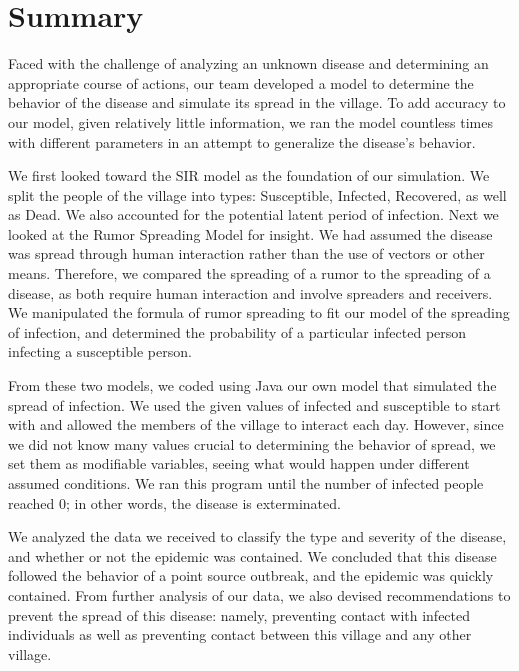 \documentclass[12pt]{article}
\begin{document}
\cfoot{}

\section{Summary}
Faced with the challenge of analyzing an unknown disease and determining an appropriate course of actions, our team developed a model to determine the behavior of the disease and simulate its spread in the village. To add accuracy to our model, given relatively little information, we ran the model countless times with different parameters in an attempt to generalize the disease’s behavior.

We first looked toward the SIR model as the foundation of our simulation. We split the people of the village into types: Susceptible, Infected, Recovered, as well as Dead. We also accounted for the potential latent period of infection. Next we looked at the Rumor Spreading Model for insight. We had assumed the disease was spread through human interaction rather than the use of vectors or other means. Therefore, we compared the spreading of a rumor to the spreading of a disease, as both require human interaction and involve spreaders and receivers. We manipulated the formula of rumor spreading to fit our model of the spreading of infection, and determined the probability of a particular infected person infecting a susceptible person.

From these two models, we coded using Java our own model that simulated the spread of infection. We used the given values of infected and susceptible to start with and allowed the members of the village to interact each day. However, since we did not know many values crucial to determining the behavior of spread, we set them as modifiable variables, seeing what would happen under different assumed conditions. We ran this program until the number of infected people reached 0; in other words, the disease is exterminated.

We analyzed the data we received to classify the type and severity of the disease, and whether or not the epidemic was contained. We concluded that this disease followed the behavior of a point source outbreak, and the epidemic was quickly contained. From further analysis of our data, we also devised recommendations to prevent the spread of this disease: namely, preventing contact with infected individuals as well as preventing contact between this village and any other village.
\end{document}
